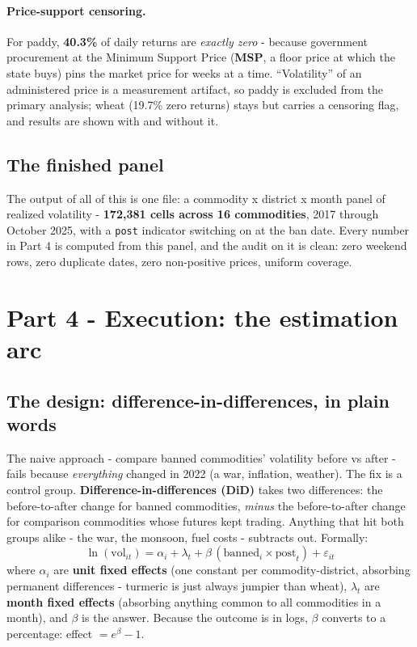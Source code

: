 \documentclass[11pt]{article}
\begin{document}
\paragraph{Price-support censoring.} For paddy, \textbf{40.3\%} of daily returns are
\emph{exactly zero} - because government procurement at the Minimum Support Price
(\textbf{MSP}, a floor price at which the state buys) pins the market price for weeks at a
time. ``Volatility'' of an administered price is a measurement artifact, so paddy is
excluded from the primary analysis; wheat (19.7\% zero returns) stays but carries a
censoring flag, and results are shown with and without it.

\subsection{The finished panel}

The output of all of this is one file: a commodity x district x month panel of realized
volatility - \textbf{172{,}381 cells across 16 commodities}, 2017 through October 2025,
with a \texttt{post} indicator switching on at the ban date. Every number in Part 4 is
computed from this panel, and the audit on it is clean: zero weekend rows, zero duplicate
dates, zero non-positive prices, uniform coverage.

\section{Part 4 - Execution: the estimation arc}

\subsection{The design: difference-in-differences, in plain words}

The naive approach - compare banned commodities' volatility before vs after - fails
because \emph{everything} changed in 2022 (a war, inflation, weather). The fix is a
control group. \textbf{Difference-in-differences (DiD)} takes two differences: the
before-to-after change for banned commodities, \emph{minus} the before-to-after change for
comparison commodities whose futures kept trading. Anything that hit both groups alike -
the war, the monsoon, fuel costs - subtracts out. Formally:
\[
\ln(\mathrm{vol}_{it}) = \alpha_i + \lambda_t + \beta\,(\mathrm{banned}_i \times
\mathrm{post}_t) + \varepsilon_{it}
\]
where $\alpha_i$ are \textbf{unit fixed effects} (one constant per commodity-district,
absorbing permanent differences - turmeric is just always jumpier than wheat),
$\lambda_t$ are \textbf{month fixed effects} (absorbing anything common to all commodities
in a month), and $\beta$ is the answer. Because the outcome is in logs, $\beta$ converts
to a percentage: effect $= e^{\beta}-1$.
\end{document}
